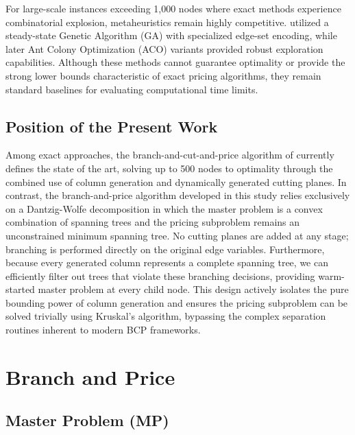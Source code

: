 \documentclass[12pt]{article}
\begin{document}
\vspace{0.5cm}
\noindent For large-scale instances exceeding 1,000 nodes where exact methods experience combinatorial explosion, metaheuristics remain highly competitive. \citet{Knowles1999} utilized a steady-state Genetic Algorithm (GA) with specialized edge-set encoding, while later Ant Colony Optimization (ACO) variants provided robust exploration capabilities. Although these methods cannot guarantee optimality or provide the strong lower bounds characteristic of exact pricing algorithms, they remain standard baselines for evaluating computational time limits.

\subsection{Position of the Present Work}
Among exact approaches, the branch-and-cut-and-price algorithm of \citet{Bicalho2016} currently defines the state of the art, solving up to 500 nodes to optimality through the combined use of column generation and dynamically generated cutting planes. 
In contrast, the branch-and-price algorithm developed in this study relies exclusively on a Dantzig-Wolfe decomposition in which the master problem is a convex combination of spanning trees and the pricing subproblem remains an unconstrained minimum spanning tree. No cutting planes are added at any stage; branching is performed directly on the original edge variables. Furthermore, because every generated column represents a complete spanning tree, we can efficiently filter out trees that violate these branching decisions, providing warm-started master problem at every child node. This design actively isolates the pure bounding power of column generation and ensures the pricing subproblem can be solved trivially using Kruskal's algorithm, bypassing the complex separation routines inherent to modern BCP frameworks.

\section{Branch and Price}

\subsection{Master Problem (MP)}
\end{document}
